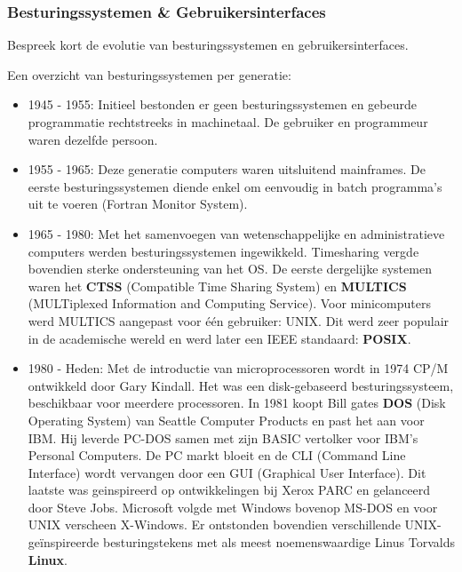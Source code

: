 \documentclass[../main.tex]{subfiles}
\begin{document}
\subsubsection{Besturingssystemen \& Gebruikersinterfaces}
\begin{question}
Bespreek kort de evolutie van besturingssystemen en gebruikersinterfaces.
\end{question}
\begin{solution}
Een overzicht van besturingssystemen per generatie:
\begin{itemize}
	\item 1945 - 1955: Initieel bestonden er geen besturingssystemen en gebeurde programmatie rechtstreeks in machinetaal. De gebruiker en programmeur waren dezelfde persoon.
	\item 1955 - 1965: Deze generatie computers waren uitsluitend mainframes. De eerste besturingssystemen diende enkel om eenvoudig in batch programma's uit te voeren (Fortran Monitor System).
	\item 1965 - 1980: Met het samenvoegen van wetenschappelijke en administratieve computers werden besturingssystemen ingewikkeld. Timesharing vergde bovendien sterke ondersteuning van het OS.
	De eerste dergelijke systemen waren het \textbf{CTSS} (Compatible Time Sharing System) en \textbf{MULTICS} (MULTiplexed Information and Computing Service). Voor minicomputers werd MULTICS aangepast voor \'e\'en gebruiker: UNIX. Dit werd zeer populair in de academische wereld en werd later een IEEE standaard: \textbf{POSIX}.
	\item 1980 - Heden: Met de introductie van microprocessoren wordt in 1974 CP/M ontwikkeld door Gary Kindall. Het was een disk-gebaseerd besturingssysteem, beschikbaar voor meerdere processoren. In 1981 koopt Bill gates \textbf{DOS} (Disk Operating System) van Seattle Computer Products en past het aan voor IBM. Hij leverde PC-DOS samen met zijn BASIC vertolker voor IBM's Personal Computers. De PC markt bloeit en de CLI (Command Line Interface) wordt vervangen door een GUI (Graphical User Interface). Dit laatste was geinspireerd op ontwikkelingen bij Xerox PARC en gelanceerd door Steve Jobs. Microsoft volgde met Windows bovenop MS-DOS en voor UNIX verscheen X-Windows. Er ontstonden bovendien verschillende UNIX-ge\"inspireerde besturingstekens met als meest noemenswaardige Linus Torvalds \textbf{Linux}.
\end{itemize}
\end{solution}
\end{document}
